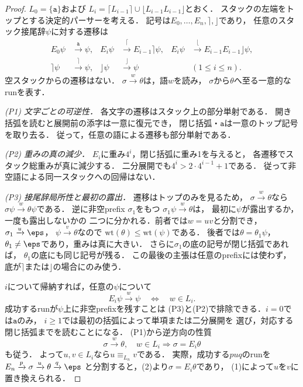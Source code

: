 \begin{proof}
$L_0=\{\mathtt a\}$および
$L_i=\lceil L_{i-1}\rceil\cup
\lfloor L_{i-1}L_{i-1}\rfloor$とおく．
スタックの左端をトップとする決定的パーサーを考える．
記号は$E_0,\ldots,E_n,\rceil,\rfloor$であり，
任意のスタック接尾辞$\psi$に対する遷移は
\[
\begin{aligned}
 E_0\psi&\xrightarrow{\mathtt a}\psi,&
 E_i\psi&\xrightarrow{\lceil}E_{i-1}\rceil\psi,&
 E_i\psi&\xrightarrow{\lfloor}E_{i-1}E_{i-1}\rfloor\psi,\\
 \rceil\psi&\xrightarrow{\rceil}\psi,&
 \rfloor\psi&\xrightarrow{\rfloor}\psi
 &&(1\le i\le n).
\end{aligned}
\]
空スタックからの遷移はない．
$\sigma\xrightarrow{w}\theta$は，語$w$を読み，
$\sigma$から$\theta$へ至る一意的なrunを表す．

\emph{(P1) 文字ごとの可逆性．}
各文字の遷移はスタック上の部分単射である．
開き括弧を読むと展開前の添字は一意に復元でき，
閉じ括弧・$\mathtt a$は一意のトップ記号を取り去る．
従って，任意の語による遷移も部分単射である．

\emph{(P2) 重みの真の減少．}
$E_i$に重み$4^i$，閉じ括弧に重み1を与えると，
各遷移でスタック総重みが真に減少する．
二分展開でも$4^i>2\cdot4^{i-1}+1$である．
従って非空語による同一スタックへの回帰はない．

\emph{(P3) 接尾辞局所性と最初の露出．}
遷移はトップのみを見るため，
$\sigma\xrightarrow{w}\theta$なら
$\sigma\psi\xrightarrow{w}\theta\psi$である．
逆に非空prefix $\sigma_1$をもつ
$\sigma_1\psi\xrightarrow{w}\theta$は，
最初に$\psi$が露出するか，一度も露出しないかの
二つに分かれる．前者では$w=uv$と分割でき，
$\sigma_1\xrightarrow{u}\eps$，
$\psi\xrightarrow{v}\theta$なので
$\mathrm{wt}(\theta)\le\mathrm{wt}(\psi)$である．
後者では$\theta=\theta_1\psi$，
$\theta_1\ne\eps$であり，重みは真に大きい．
さらに$\sigma_1$の底の記号が閉じ括弧であれば，
$\theta_1$の底にも同じ記号が残る．
この最後の主張は任意のprefixには使わず，
底が$\rceil$または$\rfloor$の場合にのみ使う．

$i$について帰納すれば，任意の$\psi$について
\[
 E_i\psi\xrightarrow{w}\psi
 \quad\Longleftrightarrow\quad w\in L_i.\tag{1}
\]
成功するrunが$\psi$上に非空prefixを残すことは
(P3)と(P2)で排除できる．$i=0$では$\mathtt a$のみ，
$i\ge1$では最初の括弧によって単項または二分展開を
選び，対応する閉じ括弧までを読むことになる．
(P1)から逆方向の性質
\[
 \sigma\xrightarrow{w}\theta,\quad w\in L_i
 \Longrightarrow \sigma=E_i\theta \tag{2}
\]
も従う．
よって$u,v\in L_i$なら$u\equiv_{L_n}v$である．
実際，成功する$puq$のrunを
$E_n\xrightarrow{p}\sigma
\xrightarrow{u}\theta\xrightarrow{q}\eps$
と分割すると，(2)より$\sigma=E_i\theta$であり，
(1)によって$u$を$v$に置き換えられる．


\end{proof}
